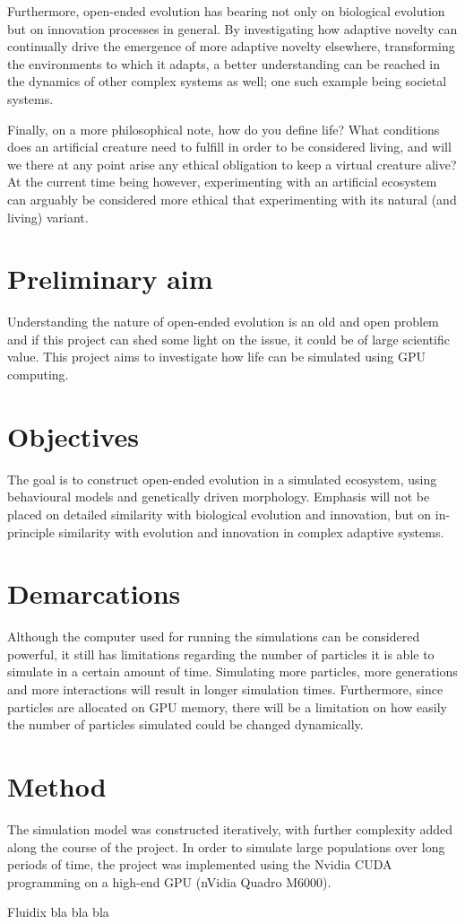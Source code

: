 Furthermore, open-ended evolution has bearing not only on biological evolution but on innovation processes in general. By investigating how adaptive novelty can continually drive the emergence of more adaptive novelty elsewhere, transforming the environments to which it adapts, a better understanding can be reached in the dynamics of other complex systems as well; one such example being societal systems.

Finally, on a more philosophical note, how do you define life? What conditions does an artificial creature need to fulfill in order to be considered living, and will we there at any point arise any ethical obligation to keep a virtual creature alive? At the current time being however, experimenting with an artificial ecosystem can arguably be considered more ethical that experimenting with its natural (and living) variant.

\section{Preliminary aim}
Understanding the nature of open-ended evolution is an old and open problem and if this project can shed some light on the issue, it could be of large scientific value. This project aims to investigate how life can be simulated using GPU computing.

\section{Objectives}
The goal is to construct open-ended evolution in a simulated ecosystem, using behavioural models and genetically driven morphology. Emphasis will not be placed on detailed similarity with biological evolution and innovation, but on in-principle similarity with evolution and innovation in complex adaptive systems.

\section{Demarcations}
Although the computer used for running the simulations can be considered powerful, it still has limitations regarding the number of particles it is able to simulate in a certain amount of time. Simulating more particles, more generations and more interactions will result in longer simulation times.  Furthermore, since particles are allocated on GPU memory, there will be a limitation on how easily the number of particles simulated could be changed dynamically.

\section{Method} %
The simulation model was constructed iteratively, with further complexity added along the course of the project. In order to simulate large populations over long periods of time, the project was implemented using the Nvidia CUDA programming on a high-end GPU (nVidia Quadro M6000).

Fluidix bla bla bla